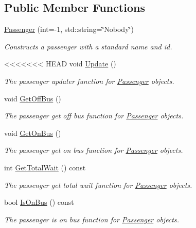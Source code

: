 \begin{figure}[H]
\begin{center}
\subsection*{Public Member Functions}
\begin{DoxyCompactItemize}
\item 
\hyperlink{classPassenger_a5c3addb9a6fd03e5e5642ed844e2702c}{Passenger} (int=-\/1, std\+::string=\char`\"{}Nobody\char`\"{})
\begin{DoxyCompactList}\small\item\em Constructs a passenger with a standard name and id. \end{DoxyCompactList}\item 
<<<<<<< HEAD
void \hyperlink{classPassenger_a960de3b29fc17a2c2d79c0b79d5cf299}{Update} ()
\begin{DoxyCompactList}\small\item\em The passenger updater function for \hyperlink{classPassenger}{Passenger} objects. \end{DoxyCompactList}\item 
void \hyperlink{classPassenger_a3cabb05dbf0c185e123f8d03368ed4f1}{Get\+Off\+Bus} ()
\begin{DoxyCompactList}\small\item\em The passenger get off bus function for \hyperlink{classPassenger}{Passenger} objects. \end{DoxyCompactList}\item 
void \hyperlink{classPassenger_ae2ba639cfef39781ac079778578bd9fe}{Get\+On\+Bus} ()
\begin{DoxyCompactList}\small\item\em The passenger get on bus function for \hyperlink{classPassenger}{Passenger} objects. \end{DoxyCompactList}\item 
int \hyperlink{classPassenger_a25158560f790ef7ef06d94c414b34f25}{Get\+Total\+Wait} () const
\begin{DoxyCompactList}\small\item\em The passenger get total wait function for \hyperlink{classPassenger}{Passenger} objects. \end{DoxyCompactList}\item 
bool \hyperlink{classPassenger_a2acf008ec444afcc859b914ee24add0e}{Is\+On\+Bus} () const
\begin{DoxyCompactList}\small\item\em The passenger is on bus function for \hyperlink{classPassenger}{Passenger} objects. \end{DoxyCompactList}\item 

\end{DoxyCompactItemize}
\end{center}
\end{figure}
